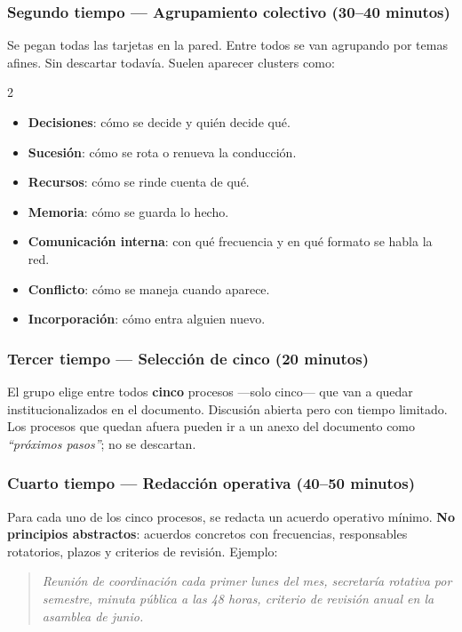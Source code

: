 \documentclass[11pt, a4paper]{article}
\begin{document}
\begin{actividad}
\subsubsection*{Segundo tiempo --- Agrupamiento colectivo (30--40 minutos)}
Se pegan todas las tarjetas en la pared. Entre todos se van agrupando por temas afines. Sin descartar todavía. Suelen aparecer clusters como:

\begin{multicols}{2}
\begin{itemize}
  \item \textbf{Decisiones}: cómo se decide y quién decide qué.
  \item \textbf{Sucesión}: cómo se rota o renueva la conducción.
  \item \textbf{Recursos}: cómo se rinde cuenta de qué.
  \item \textbf{Memoria}: cómo se guarda lo hecho.
  \item \textbf{Comunicación interna}: con qué frecuencia y en qué formato se habla la red.
  \item \textbf{Conflicto}: cómo se maneja cuando aparece.
  \item \textbf{Incorporación}: cómo entra alguien nuevo.
\end{itemize}
\end{multicols}

\subsubsection*{Tercer tiempo --- Selección de cinco (20 minutos)}
El grupo elige entre todos \textbf{cinco} procesos ---solo cinco--- que van a quedar institucionalizados en el documento. Discusión abierta pero con tiempo limitado. Los procesos que quedan afuera pueden ir a un anexo del documento como \emph{``próximos pasos''}; no se descartan.

\subsubsection*{Cuarto tiempo --- Redacción operativa (40--50 minutos)}
Para cada uno de los cinco procesos, se redacta un acuerdo operativo mínimo. \textbf{No principios abstractos}: acuerdos concretos con frecuencias, responsables rotatorios, plazos y criterios de revisión. Ejemplo:

\begin{quote}
\textit{Reunión de coordinación cada primer lunes del mes, secretaría rotativa por semestre, minuta pública a las 48 horas, criterio de revisión anual en la asamblea de junio.}
\end{quote}


\end{actividad}
\end{document}
